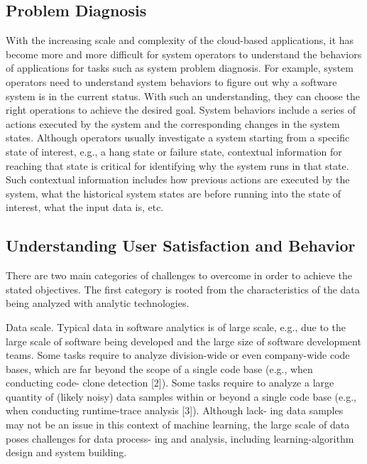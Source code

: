 \subsection{Problem Diagnosis}
With the increasing scale and complexity of the cloud-based applications, it has become more and more difficult for system operators to understand the behaviors of applications for tasks such as system problem diagnosis. For example, system operators need to understand system behaviors to figure out why a software system is in the current status. With such an understanding, they can choose the right operations to achieve the desired goal. System behaviors include a series of actions executed by the system and the corresponding changes in the system states. Although operators usually investigate a system starting from a specific state of interest, e.g., a hang state or failure state, contextual information for reaching that state is critical for identifying why the system runs in that state. Such contextual information includes how previous actions are executed by the system, what the historical system states are before running into the state of interest, what the input data is, etc.


\subsection{Understanding User Satisfaction and Behavior}
There are two main categories of challenges to overcome in order to achieve the stated objectives. The first category is rooted from the characteristics of the data being analyzed with analytic technologies. 

Data scale. 
Typical data in software analytics is of large scale, e.g., due to the large scale of software being developed and the large size of software development teams. Some tasks require to analyze division-wide or even company-wide code bases, which are far beyond the scope of a single code base (e.g., when conducting code- clone detection [2]). Some tasks require to analyze a large quantity of (likely noisy) data samples within or beyond a single code base (e.g., when conducting runtime-trace analysis [3]). Although lack- ing data samples may not be an issue in this context of machine learning, the large scale of data poses challenges for data process- ing and analysis, including learning-algorithm design and system building. 

